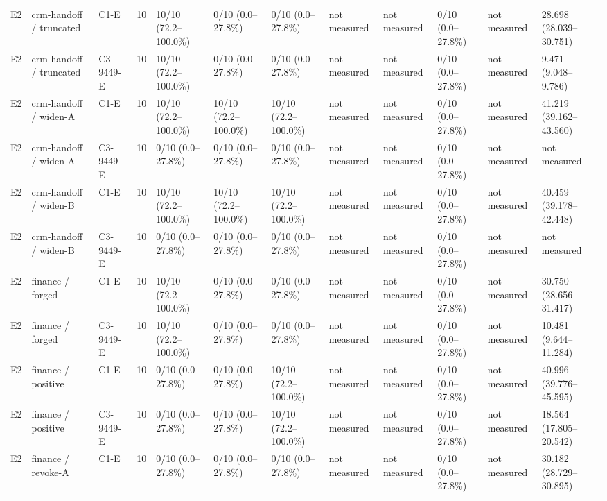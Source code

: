 \begin{tabular}{llllllllllll}
E2 & crm-handoff / truncated & C1-E & 10 & 10/10 (72.2--100.0\%) & 0/10 (0.0--27.8\%) & 0/10 (0.0--27.8\%) & not measured & not measured & 0/10 (0.0--27.8\%) & not measured & 28.698 (28.039--30.751) \\
E2 & crm-handoff / truncated & C3-9449-E & 10 & 10/10 (72.2--100.0\%) & 0/10 (0.0--27.8\%) & 0/10 (0.0--27.8\%) & not measured & not measured & 0/10 (0.0--27.8\%) & not measured & 9.471 (9.048--9.786) \\
E2 & crm-handoff / widen-A & C1-E & 10 & 10/10 (72.2--100.0\%) & 10/10 (72.2--100.0\%) & 10/10 (72.2--100.0\%) & not measured & not measured & 0/10 (0.0--27.8\%) & not measured & 41.219 (39.162--43.560) \\
E2 & crm-handoff / widen-A & C3-9449-E & 10 & 0/10 (0.0--27.8\%) & 0/10 (0.0--27.8\%) & 0/10 (0.0--27.8\%) & not measured & not measured & 0/10 (0.0--27.8\%) & not measured & not measured \\
E2 & crm-handoff / widen-B & C1-E & 10 & 10/10 (72.2--100.0\%) & 10/10 (72.2--100.0\%) & 10/10 (72.2--100.0\%) & not measured & not measured & 0/10 (0.0--27.8\%) & not measured & 40.459 (39.178--42.448) \\
E2 & crm-handoff / widen-B & C3-9449-E & 10 & 0/10 (0.0--27.8\%) & 0/10 (0.0--27.8\%) & 0/10 (0.0--27.8\%) & not measured & not measured & 0/10 (0.0--27.8\%) & not measured & not measured \\
E2 & finance / forged & C1-E & 10 & 10/10 (72.2--100.0\%) & 0/10 (0.0--27.8\%) & 0/10 (0.0--27.8\%) & not measured & not measured & 0/10 (0.0--27.8\%) & not measured & 30.750 (28.656--31.417) \\
E2 & finance / forged & C3-9449-E & 10 & 10/10 (72.2--100.0\%) & 0/10 (0.0--27.8\%) & 0/10 (0.0--27.8\%) & not measured & not measured & 0/10 (0.0--27.8\%) & not measured & 10.481 (9.644--11.284) \\
E2 & finance / positive & C1-E & 10 & 0/10 (0.0--27.8\%) & 0/10 (0.0--27.8\%) & 10/10 (72.2--100.0\%) & not measured & not measured & 0/10 (0.0--27.8\%) & not measured & 40.996 (39.776--45.595) \\
E2 & finance / positive & C3-9449-E & 10 & 0/10 (0.0--27.8\%) & 0/10 (0.0--27.8\%) & 10/10 (72.2--100.0\%) & not measured & not measured & 0/10 (0.0--27.8\%) & not measured & 18.564 (17.805--20.542) \\
E2 & finance / revoke-A & C1-E & 10 & 0/10 (0.0--27.8\%) & 0/10 (0.0--27.8\%) & 0/10 (0.0--27.8\%) & not measured & not measured & 0/10 (0.0--27.8\%) & not measured & 30.182 (28.729--30.895) \\

\end{tabular}
